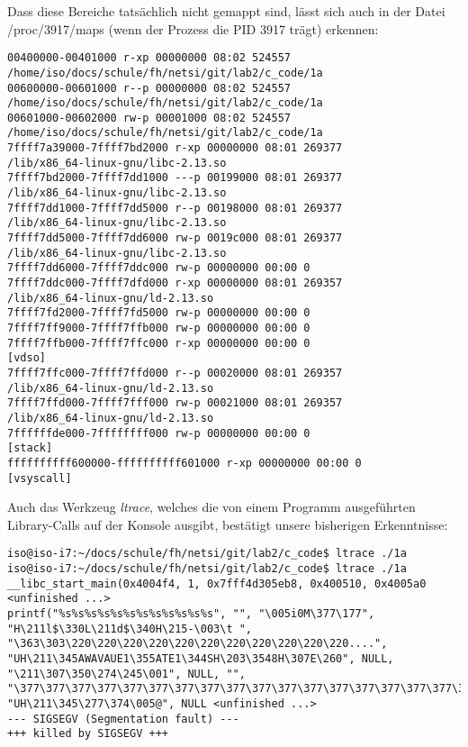 \documentclass[a4paper,11pt,parskip=half]{scrartcl}
\begin{document}
Dass diese Bereiche tatsächlich nicht gemappt sind, lässt sich auch in der Datei /proc/3917/maps (wenn der Prozess die PID 3917 trägt) erkennen:
\begin{lstlisting}
00400000-00401000 r-xp 00000000 08:02 524557                             /home/iso/docs/schule/fh/netsi/git/lab2/c_code/1a
00600000-00601000 r--p 00000000 08:02 524557                             /home/iso/docs/schule/fh/netsi/git/lab2/c_code/1a
00601000-00602000 rw-p 00001000 08:02 524557                             /home/iso/docs/schule/fh/netsi/git/lab2/c_code/1a
7ffff7a39000-7ffff7bd2000 r-xp 00000000 08:01 269377                     /lib/x86_64-linux-gnu/libc-2.13.so
7ffff7bd2000-7ffff7dd1000 ---p 00199000 08:01 269377                     /lib/x86_64-linux-gnu/libc-2.13.so
7ffff7dd1000-7ffff7dd5000 r--p 00198000 08:01 269377                     /lib/x86_64-linux-gnu/libc-2.13.so
7ffff7dd5000-7ffff7dd6000 rw-p 0019c000 08:01 269377                     /lib/x86_64-linux-gnu/libc-2.13.so
7ffff7dd6000-7ffff7ddc000 rw-p 00000000 00:00 0 
7ffff7ddc000-7ffff7dfd000 r-xp 00000000 08:01 269357                     /lib/x86_64-linux-gnu/ld-2.13.so
7ffff7fd2000-7ffff7fd5000 rw-p 00000000 00:00 0 
7ffff7ff9000-7ffff7ffb000 rw-p 00000000 00:00 0 
7ffff7ffb000-7ffff7ffc000 r-xp 00000000 00:00 0                          [vdso]
7ffff7ffc000-7ffff7ffd000 r--p 00020000 08:01 269357                     /lib/x86_64-linux-gnu/ld-2.13.so
7ffff7ffd000-7ffff7fff000 rw-p 00021000 08:01 269357                     /lib/x86_64-linux-gnu/ld-2.13.so
7ffffffde000-7ffffffff000 rw-p 00000000 00:00 0                          [stack]
ffffffffff600000-ffffffffff601000 r-xp 00000000 00:00 0                  [vsyscall]
\end{lstlisting}

Auch das Werkzeug \emph{ltrace}, welches die von einem Programm ausgeführten Library-Calls auf der Konsole ausgibt, bestätigt unsere bisherigen Erkenntnisse:
\begin{lstlisting}
iso@iso-i7:~/docs/schule/fh/netsi/git/lab2/c_code$ ltrace ./1a
iso@iso-i7:~/docs/schule/fh/netsi/git/lab2/c_code$ ltrace ./1a
__libc_start_main(0x4004f4, 1, 0x7fff4d305eb8, 0x400510, 0x4005a0 <unfinished ...>
printf("%s%s%s%s%s%s%s%s%s%s%s%s", "", "\005i0M\377\177", "H\211l$\330L\211d$\340H\215-\003\t ", "\363\303\220\220\220\220\220\220\220\220\220\220\220....", "UH\211\345AWAVAUE1\355ATE1\344SH\203\3548H\307E\260", NULL, "\211\307\350\274\245\001", NULL, "", "\377\377\377\377\377\377\377\377\377\377\377\377\377\377\377\377\377\377"..., "UH\211\345\277\374\005@", NULL <unfinished ...>
--- SIGSEGV (Segmentation fault) ---
+++ killed by SIGSEGV +++
\end{lstlisting}
\end{document}
